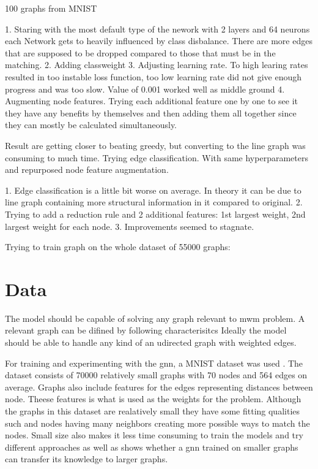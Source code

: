 100 graphs from MNIST

1. Staring with the most default type of the nework with 2 layers and 64 neurons each
	Network gets to heavily influenced by class disbalance. There are more edges that are supposed to be dropped compared to those that must be in the matching.
2. Adding classweight
3. Adjusting learning rate. To high learing rates resulted in too instable loss function, too low learning rate did not give enough progress and was too slow. Value of 0.001 worked well as middle ground
4. Augmenting node features. Trying each additional feature one by one to see it they have any benefits by themselves and then adding them all together since they can mostly be calculated simultaneously.

Result are getting closer to beating greedy, but converting to the line graph was consuming to much time. Trying edge classification. With same hyperparameters and repurposed node feature augmentation.

1. Edge classification is a little bit worse on average. In theory it can be due to line graph containing more structural information in it compared to original.
2. Trying to add a reduction rule and 2 additional features:  1st largest weight, 2nd largest weight for each node.
3. Improvements seemed to stagnate.

Trying to train graph on the whole dataset of 55000 graphs:









\section{Data}

The model should be capable of solving any graph relevant to \gls{mwm} problem. A relevant graph can be difined by following characterisitcs
Ideally the model should be able to handle any kind of an udirected graph with weighted edges.

For training and experimenting with the \gls{gnn}, a MNIST dataset was used \cite{dwivedi2022benchmarking}. The dataset consists of 70000 relatively small graphs with 70 nodes and 564 edges on average. Graphs also include features for the edges representing distances between node. Theese features is what is used as the weights for the problem. Although the graphs in this dataset are realatively small they have some fitting qualities such and nodes having many neighbors creating more possible ways to match the nodes. Small size also makes it less time consuming to train the models and try different approaches as well as shows whether a \gls{gnn} trained on smaller graphs can transfer its knowledge to larger graphs.

